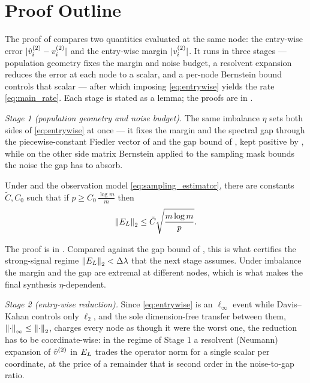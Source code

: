 \section{Proof Outline}\label{sec:outline}
The proof of  compares two quantities evaluated at the same
node: the entry-wise error $|\hat v^{(2)}_i-v^{(2)}_i|$ and the entry-wise margin $|v^{(2)}_i|$.
It runs in three stages --- population geometry fixes the margin and noise
budget, a resolvent expansion reduces the error at each node to a scalar, and a
per-node Bernstein bound controls that scalar --- after which imposing
\eqref{eq:entrywise} yields the rate \eqref{eq:main_rate}. Each stage is stated
as a lemma; the proofs are in .

\emph{Stage 1 (population geometry and noise budget).} The same imbalance $\eta$
sets both sides of \eqref{eq:entrywise} at once --- it fixes the margin and the
spectral gap through the piecewise-constant Fiedler vector of
 and the gap bound of , kept positive by
, while on the other side matrix Bernstein applied to the
sampling mask bounds the noise the gap has to absorb.

\begin{lemma}\label{lem:B-bernstein}
Under  and the observation model
\eqref{eq:sampling_estimator}, there are constants $\tilde C,C_0$
such that if $p\ge C_0\,\tfrac{\log m}{m}$ then \hp
\[
   \left\lVert E_{L} \right\rVert_{2}\le\tilde C\sqrt{\frac{m\log m}{p}}.
\]
\end{lemma}
\noindent The proof is in . Compared against the gap bound of
, this is what certifies the strong-signal regime
$\left\lVert E_{L} \right\rVert_{2}<\Delta\lambda$ that the next stage assumes. Under imbalance the margin and
the gap are extremal at different nodes, which is what makes the final synthesis
$\eta$-dependent.

\emph{Stage 2 (entry-wise reduction).} Since \eqref{eq:entrywise} is an
$\ell_\infty$ event while Davis--Kahan controls only $\ell_2$, and the sole
dimension-free transfer between them, $\left\lVert \cdot \right\rVert_\infty\le\left\lVert \cdot \right\rVert_2$,
charges every node as though it were the worst one, the reduction has to be
coordinate-wise: in the regime of Stage 1 a resolvent (Neumann) expansion of
$\hat v^{(2)}$ in $E_{L}$ trades the operator norm for a single scalar per coordinate, at
the price of a remainder that is second order in the noise-to-gap ratio.

